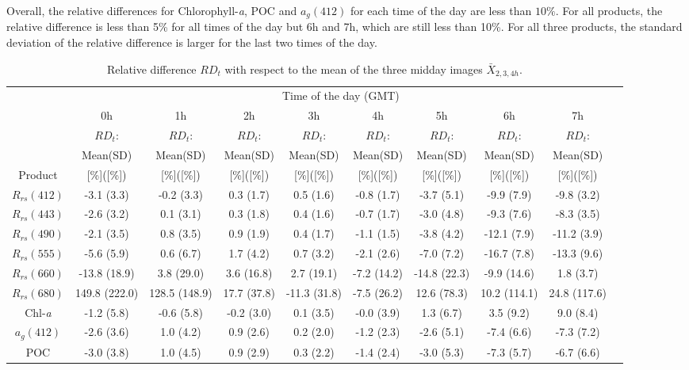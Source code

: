 \documentclass[onecolumn,3p,letterpaper,11pt]{elsarticle}
\begin{document}
Overall, the relative differences for Chlorophyll-{\it a}, POC and $a_g(412)$ for each time of the day are less than $10\%$. For all products, the relative difference is less than 5\% for all times of the day but 6h and 7h, which are still less than 10\%. For all three products, the standard deviation of the relative difference is larger for the last two times of the day.
\begin{table}[htbp!]
\internallinenumbers
\caption{Relative difference $RD_t$ with respect to the mean of the three midday images $\bar{X}_{2,3,4h}$.\label{tab:rel_diff} } 
\scriptsize
\centering
\setlength\tabcolsep{1.5pt} %
\begin{tabular}{cccccccccc} \hline
      &   \multicolumn{8}{c}{Time of the day (GMT)}   \\ \cline{2-9}
   &    0h    & 1h  &  2h  &  3h  &  4h  &  5h  &  6h   &  7h   \\ 
   &    $RD_t$:    & $RD_t$:  &  $RD_t$:  &  $RD_t$:  &  $RD_t$:  &  $RD_t$:  &  $RD_t$:   &  $RD_t$:   \\ 
  &    Mean(SD)    & Mean(SD)  &  Mean(SD)  &  Mean(SD)  &  Mean(SD)  &  Mean(SD)  &  Mean(SD)   &  Mean(SD)   \\ 
Product    &    [\%]([\%])    & [\%]([\%])  &  [\%]([\%])  &  [\%]([\%])  &  [\%]([\%])  &  [\%]([\%])  &  [\%]([\%])   &  [\%]([\%])   \\ \hline \hline
$R_{rs}(412)$ &  -3.1 (3.3) & -0.2 (3.3) & 0.3 (1.7) & 0.5 (1.6) & -0.8 (1.7) & -3.7 (5.1) & -9.9  (7.9) & -9.8  (3.2) \\
$R_{rs}(443)$ &  -2.6 (3.2) &  0.1 (3.1) & 0.3 (1.8) & 0.4 (1.6) & -0.7 (1.7) & -3.0 (4.8) & -9.3  (7.6) & -8.3  (3.5) \\
$R_{rs}(490)$ &  -2.1 (3.5) &  0.8 (3.5) & 0.9 (1.9) & 0.4 (1.7) & -1.1 (1.5) & -3.8 (4.2) & -12.1 (7.9) & -11.2 (3.9) \\
$R_{rs}(555)$ &  -5.6 (5.9) &  0.6 (6.7) & 1.7 (4.2) & 0.7 (3.2) & -2.1 (2.6) & -7.0 (7.2) & -16.7 (7.8) & -13.3 (9.6) \\
$R_{rs}(660)$ & -13.8 (18.9) & 3.8 (29.0) & 3.6 (16.8) & 2.7 (19.1) & -7.2 (14.2) & -14.8 (22.3) & -9.9 (14.6) & 1.8 (3.7) \\
$R_{rs}(680)$ &  149.8 (222.0) & 128.5 (148.9) & 17.7 (37.8) & -11.3 (31.8) & -7.5 (26.2) & 12.6 (78.3) & 10.2 (114.1) & 24.8 (117.6) \\ 
Chl-\it{a} & -1.2 (5.8) &   -0.6 (5.8) &   -0.2 (3.0) &    0.1 (3.5) &   -0.0 (3.9) &    1.3 (6.7) &    3.5 (9.2) &    9.0 (8.4) \\
$a_{g}(412)$ & -2.6 (3.6) &    1.0 (4.2) &    0.9 (2.6) &    0.2 (2.0) &   -1.2 (2.3) &   -2.6 (5.1) &   -7.4 (6.6) &   -7.3 (7.2) \\
POC & -3.0 (3.8) &    1.0 (4.5) &    0.9 (2.9) &    0.3 (2.2) &   -1.4 (2.4) &   -3.0 (5.3) &   -7.3 (5.7) &   -6.7 (6.6) \\ \hline
 \end{tabular}
\end{table}
\end{document}
